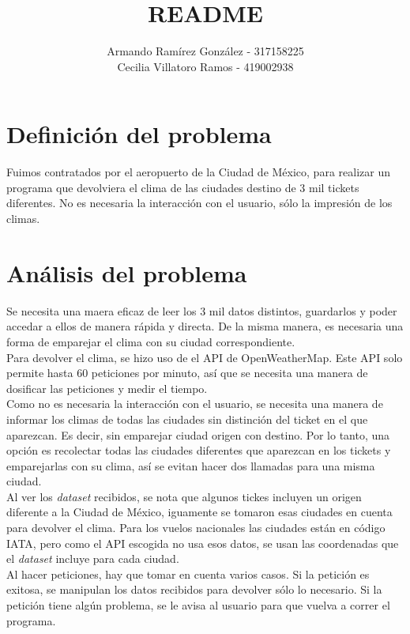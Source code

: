 \documentclass[]{article}
\title{README}
\author{Armando Ramírez González - 317158225 \\ Cecilia Villatoro Ramos - 
419002938}
\begin{document}
\maketitle

\section{Definición del problema}

Fuimos contratados por el aeropuerto de la Ciudad de México, para realizar un programa que devolviera el clima de las ciudades destino de 3 mil tickets diferentes. No es necesaria la interacción con el usuario, sólo la impresión de los climas.

\section{Análisis del problema}

Se necesita una maera eficaz de leer los 3 mil datos distintos, guardarlos y 
poder accedar a ellos de manera rápida y directa. De la misma manera, es 
necesaria una forma de emparejar el clima con su ciudad correspondiente.\\

Para devolver el clima, se hizo uso de el API de OpenWeatherMap. Este API
solo permite hasta 60 peticiones por minuto, así que se necesita una 
manera de dosificar las peticiones y medir el tiempo.\\

Como no es necesaria la interacción con el usuario, se necesita 
una manera de informar los climas de todas las ciudades sin distinción del 
ticket en el que aparezcan. Es decir, sin emparejar ciudad origen con 
destino. Por lo tanto, una opción es recolectar todas las ciudades 
diferentes que aparezcan en los tickets y emparejarlas con su clima, así 
se evitan hacer dos llamadas para una misma ciudad.\\

Al ver los \emph{dataset} recibidos, se nota que algunos tickes incluyen 
un origen diferente a la Ciudad de México, iguamente se tomaron esas 
ciudades en cuenta para devolver el clima. Para los vuelos nacionales las 
ciudades están en código IATA, pero como el API escogida no usa esos 
datos, se usan las coordenadas que el \emph{dataset} incluye para cada 
ciudad. \\

Al hacer peticiones, hay que tomar en cuenta varios casos. Si la petición 
es exitosa, se manipulan los datos recibidos para devolver sólo lo 
necesario. Si la petición tiene algún problema, se le avisa al usuario para 
que vuelva a correr el programa. \\
\end{document}
